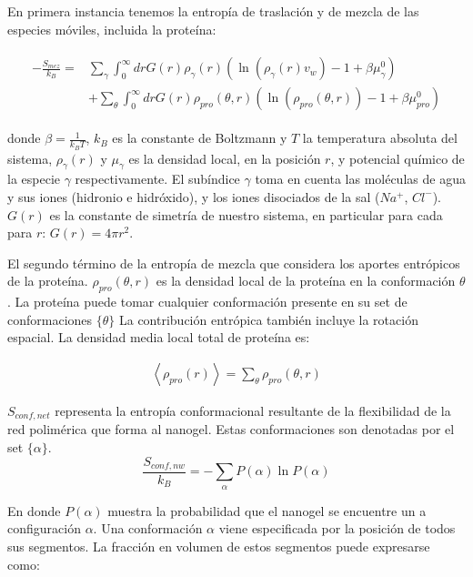 En primera instancia tenemos la entrop\'ia de traslaci\'on y de mezcla de las especies m\'oviles, incluida la prote\'ina:


\begin{align}
	\begin{aligned}
		-\frac{S_{mez}}{k_B}= &\sum_{\gamma}\int_0^\infty{dr G(r)\rho_\gamma(r)\left(\ln \left(\rho_\gamma (r)v_w\right) -1 + \beta\mu^0_\gamma\right)} \\
		&+ \sum_{\theta}\int_0^\infty{dr G(r)\rho_{pro}(\theta,r)\left(\ln \left(\rho_{pro}(\theta,r)\right) -1 + \beta\mu^0_{pro} \right)}
	\end{aligned}
\end{align}



\noindent donde $\beta = \frac{1}{k_BT}$, $k_B$ es la constante de Boltzmann y $T$ la temperatura absoluta del sistema, $\rho_\gamma(r)$ y $\mu_\gamma$ es la densidad local, en la posici\'on $r$, y potencial qu\'imico de la especie $\gamma$ respectivamente.
El sub\'indice $\gamma$ toma en cuenta las mol\'eculas de agua y sus iones (hidronio e hidr\'oxido), y los iones disociados de la sal ($Na^+$, $Cl^-$). $G(r)$ es la constante de simetr\'ia de nuestro sistema, en particular para cada para $r$: $G(r) =4\pi r^2$. %

El segundo t\'ermino de la entrop\'ia de mezcla que considera los aportes entr\'opicos de la prote\'ina.
$\rho_{pro}(\theta,r)$ es la densidad local de la prote\'ina en la conformaci\'on  $\theta$.  La prote\'ina puede tomar cualquier conformaci\'on presente en su set de conformaciones $\{\theta \}$
La contribuci\'on entr\'opica tambi\'en incluye la rotaci\'on espacial.
La densidad media local total de prote\'ina es: 


\begin{align}
	\left<\rho_{pro}(r)\right> = \sum_\theta{\rho_{pro}(\theta,r)}
\end{align}




$S_{conf,net}$ representa la entrop\'ia conformacional resultante de la flexibilidad de la red polim\'erica que forma al nanogel. Estas conformaciones son  denotadas por el set $\{\alpha\}$. 
\begin{equation}
	\frac{S_{conf,nw}}{k_B} = - \sum_{\alpha}{P(\alpha)\ln P(\alpha)}
\end{equation}


\noindent En donde $P(\alpha)$ muestra la probabilidad que el nanogel se encuentre un a configuraci\'on $\alpha$.
Una conformaci\'on $\alpha$ viene especificada por la posici\'on de todos sus segmentos. 
La fracci\'on en volumen de estos segmentos puede expresarse como:

